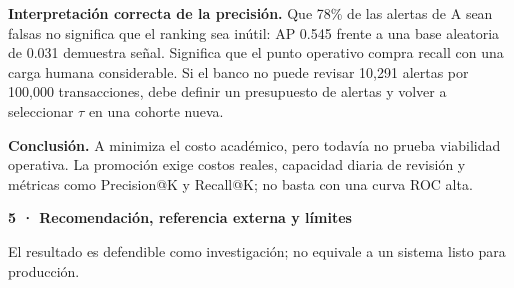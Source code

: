 \documentclass[10pt]{article}
\newcommand{\pagetitle}[2]{%
  {\color{navy}\LARGE\bfseries #1\par}
  \vspace{1.5pt}{\color{teal}\rule{\linewidth}{1.6pt}}\vspace{2pt}
  {\color{muted}\small #2\par}\vspace{5pt}
}
\newcommand{\takeaway}[1]{%
  \begingroup\setlength{\fboxsep}{7pt}%
  \noindent\colorbox{mint}{\parbox{\dimexpr\linewidth-2\fboxsep\relax}{\color{navy}\small\textbf{Conclusión.} #1}}%
  \endgroup
}
\newcommand{\warningbox}[1]{%
  \begingroup\setlength{\fboxsep}{6pt}%
  \noindent\colorbox{sand}{\parbox{\dimexpr\linewidth-2\fboxsep\relax}{\color{ink}\small #1}}%
  \endgroup
}
\begin{document}
\vspace{5pt}
\warningbox{\textbf{Interpretación correcta de la precisión.} Que 78\% de las alertas de A sean falsas no significa que el ranking sea inútil: AP 0.545 frente a una base aleatoria de 0.031 demuestra señal. Significa que el punto operativo compra recall con una carga humana considerable. Si el banco no puede revisar 10,291 alertas por 100,000 transacciones, debe definir un presupuesto de alertas y volver a seleccionar $\tau$ en una cohorte nueva.}

\vfill
\takeaway{A minimiza el costo académico, pero todavía no prueba viabilidad operativa. La promoción exige costos reales, capacidad diaria de revisión y métricas como Precision@K y Recall@K; no basta con una curva ROC alta.}

\clearpage

\pagetitle{5 · Recomendación, referencia externa y límites}{El resultado es defendible como investigación; no equivale a un sistema listo para producción.}
\end{document}

